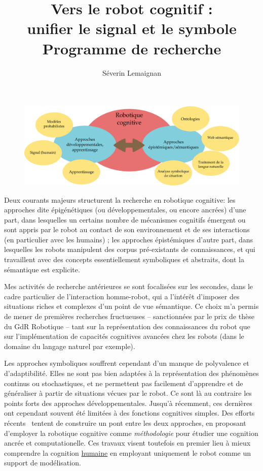 \documentclass[a4paper]{article}
\title{Vers le robot cognitif :\\ unifier le signal et le symbole\\ 
    {\large Programme de recherche}}
\author{Séverin Lemaignan}
\date{}
\begin{document}
\maketitle

\begin{figure}
    \centering
    \includegraphics[width=1.0\linewidth]{place}
    \caption{}
    \label{place}
\end{figure}


Deux courants majeurs structurent la recherche en robotique cognitive: les
approches dite épigénétiques (ou développementales, ou encore ancrées) d'une
part, dans lesquelles un certains nombre de mécanismes cognitifs émergent ou
sont appris par le robot au contact de son environnement et de ses interactions
(en particulier avec les humains) ; les approches épistémiques d'autre part,
dans lesquelles les robots manipulent des corpus pré-existants de connaissances,
et qui travaillent avec des concepts essentiellement symboliques et abstraits,
dont la sémantique est explicite.

Mes activités de recherche antérieures se sont focalisées sur les secondes, dans
le cadre particulier de l'interaction homme-robot, qui a l'intérêt d'imposer des
situations riches et complexes d'un point de vue sémantique. Ce choix m'a permis
de mener de premières recherches fructueuses -- sanctionnées par le prix de
thèse du GdR Robotique -- tant sur la représentation des connaissances du robot
que sur l'implémentation de capacités cognitives avancées chez les robots (dans
le domaine du langage naturel par exemple). 

Les approches symboliques souffrent cependant d'un manque de polyvalence et
d'adaptibilité. Elles ne sont pas bien adaptées à la représentation des
phénomènes continus ou stochastiques, et ne permettent pas facilement
d'apprendre et de généraliser à partir de situations vécues par le robot. Ce
sont là au contraire les points forts des approches développementales.  Jusqu'à
récemment, ces dernières ont cependant souvent été limitées à des fonctions
cognitives simples. Des efforts récents~\cite{morse2010epigenetic,
pezzulo2012computational} tentent de construire un pont entre les deux
approches, en proposant d'employer la robotique cognitive comme
\emph{méthodologie} pour étudier une cognition ancrée et computationelle. Ces
travaux visent toutefois en premier lieu à mieux comprendre la cognition
\underline{humaine} en employant uniquement le robot comme un support de
modélisation.
\end{document}
